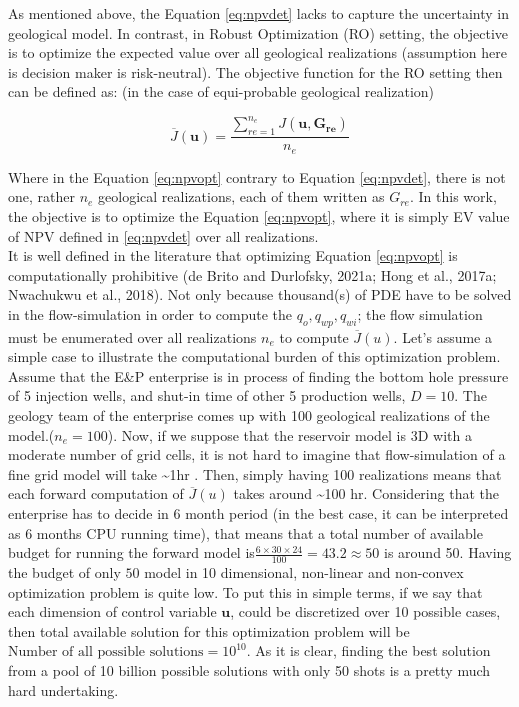 \documentclass[]{elsarticle} %
\begin{document}
As mentioned above, the Equation \eqref{eq:npvdet} lacks to capture the uncertainty in geological model. In contrast, in Robust Optimization (RO) setting, the objective is to optimize the expected value over all geological realizations (assumption here is decision maker is risk-neutral). The objective function for the RO setting then can be defined as: (in the case of equi-probable geological realization)

\begin{equation}
\overline{J}(\mathbf{u}) = \frac{\sum_{re=1}^{n_e} J(\mathbf{u,G_{re}})}{n_e}
\label{eq:npvopt}
\end{equation}

Where in the Equation \eqref{eq:npvopt} contrary to Equation \eqref{eq:npvdet}, there is not one, rather \(n_e\) geological realizations, each of them written as \(G_{re}\). In this work, the objective is to optimize the Equation \eqref{eq:npvopt}, where it is simply EV value of NPV defined in \eqref{eq:npvdet} over all realizations.\\

It is well defined in the literature that optimizing Equation \eqref{eq:npvopt} is computationally prohibitive (de Brito and Durlofsky, 2021a; Hong et al., 2017a; Nwachukwu et al., 2018). Not only because thousand(s) of PDE have to be solved in the flow-simulation in order to compute the \(q_o, q_{wp}, q_{wi}\); the flow simulation must be enumerated over all realizations \(n_e\) to compute \(\overline{J}(u)\). Let's assume a simple case to illustrate the computational burden of this optimization problem. Assume that the E\&P enterprise is in process of finding the bottom hole pressure of 5 injection wells, and shut-in time of other 5 production wells, \(D=10\). The geology team of the enterprise comes up with 100 geological realizations of the model.(\(n_e=100\)). Now, if we suppose that the reservoir model is 3D with a moderate number of grid cells, it is not hard to imagine that flow-simulation of a fine grid model will take \textasciitilde1hr . Then, simply having 100 realizations means that each forward computation of \(\overline{J}(u)\) takes around \textasciitilde100 hr. Considering that the enterprise has to decide in 6 month period (in the best case, it can be interpreted as 6 months CPU running time), that means that a total number of available budget for running the forward model is\(\frac{6 \times 30 \times 24 }{100}= 43.2 \approx 50\) is around 50. Having the budget of only \(50\) model in 10 dimensional, non-linear and non-convex optimization problem is quite low. To put this in simple terms, if we say that each dimension of control variable \(\mathbf{u}\), could be discretized over 10 possible cases, then total available solution for this optimization problem will be \(\text {Number of all possible solutions} = 10^{10}\). As it is clear, finding the best solution from a pool of 10 billion possible solutions with only 50 shots is a pretty much hard undertaking.\\
\end{document}
